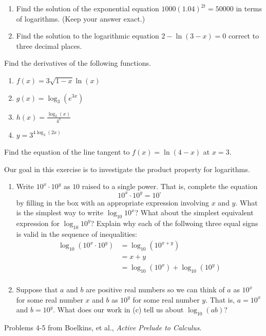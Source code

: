 \documentclass{ximera}
\begin{document}
\begin{exercise}
    \begin{enumerate}
        \item Find the solution of the exponential equation $1000(1.04)^{2t}=50000$ in terms of logarithms. (Keep your answer exact.)
        \item Find the solution to the logarithmic equation $2-\ln(3-x)=0$ correct to three decimal places.
    \end{enumerate}
\end{exercise}

\begin{exercise}
    Find the derivatives of the following functions.
    \begin{enumerate}
        \item $f(x)=3\sqrt{1-x}\ln(x)$
        \item $g(x)=\log_3(e^{3x})$
        \item $h(x)=\frac{\log_2(x)}{4^x}$
        \item $y=3^{4\log_3(2x)}$
    \end{enumerate}
\end{exercise}

\begin{exercise}
    Find the equation of the line tangent to $f(x)=\ln(4-x)$ at $x=3$.
\end{exercise}
    


\begin{exercise}
    Our goal in this exercise is to investigate the product property for logarithms.
    \begin{enumerate}
        \item Write $10^x\cdot 10^y$ as $10$ raised to a single power.  That is, complete the equation \[10^x\cdot 10^y = 10^{\square}\]
        by filling in the box with an appropriate expression involving $x$ and $y$.
        What is the simplest way to write $\log_{10}10^x$?  What about the simplest equivalent expression for $\log_{10}10^y$?
        Explain why each of the follwoing three equal signs is valid in the sequence of inequalities:
        \begin{align}
            \log_{10}(10^x\cdot 10^y) & =\log_{10}(10^{x+y})\\
            &=x+y\\
            &= \log_{10}(10^x) + \log_{10}(10^y)\\
        \end{align}
        \item Suppose that $a$ and $b$ are positive real numbers so we can think of $a$ as $10^x$ for some real number $x$ and $b$ as $10^y$ for some real number $y$. That is, $a=10^x$ and $b=10^y$. What does our work in (c) tell us about $\log_{10}(ab)$?
    \end{enumerate}
\end{exercise}

Problems 4-5 from Boelkins, et al., \textit{Active Prelude to Calculus}.
\end{document}
